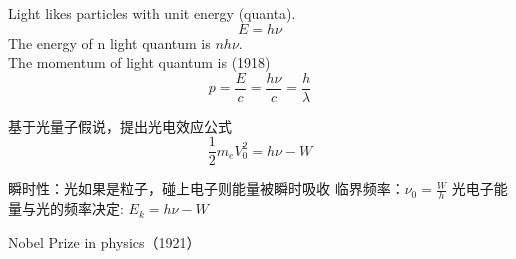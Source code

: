 \begin{frame}
    \frametitle{}
        \begin{figure}
            \centering
        \end{figure}
    \setcounter{subfigure}{0}
\end{frame}

\begin{frame} 
    \begin{tcolorbox4}
        {\Bullet} Light likes particles with unit energy  (quanta).\\
        \[E=h\nu\]  
        {\Bullet} The energy of n light quantum is $nh\nu$. \\
        {\Bullet} The momentum of light quantum is (1918) \\
        \[p=\frac{E}{c}=\frac{h\nu}{c}=\frac{h}{\lambda}\]
    \end{tcolorbox4}
\end{frame}

\begin{frame} 
    基于光量子假说，提出光电效应公式
    \[
    \frac{1}{2}m_eV_0^2=h\nu-W
    \]
    \begin{itemize}
        \Item  瞬时性：光如果是粒子，碰上电子则能量被瞬时吸收
        \Item  临界频率：$\nu_0=\frac{W}{h} $
        \Item  光电子能量与光的频率决定: $E_k=h\nu-W$
    \end{itemize}
    {\color{deepred} Nobel Prize in physics（1921）}
\end{frame}

